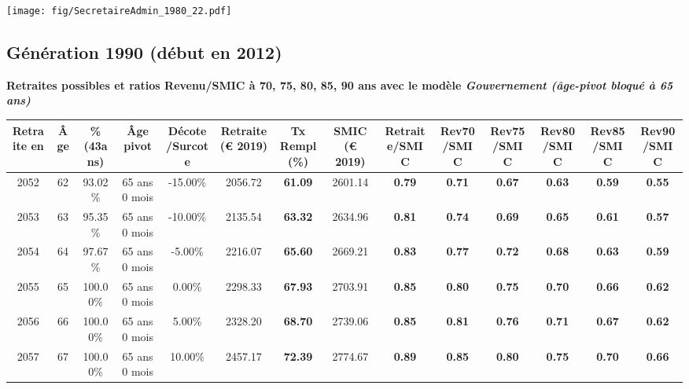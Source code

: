  \vspace{0.1cm} 

 \begin{center}\texttt{[image: fig/SecretaireAdmin\_1980\_22.pdf]}\end{center} \label{fig/SecretaireAdmin_1980_22.pdf} 

\newpage 
 
\subsection{Génération 1990 (début en 2012)} 

{\bf \noindent Retraites possibles et ratios Revenu/SMIC à 70, 75, 80, 85, 90 ans avec le modèle \emph{Gouvernement (âge-pivot bloqué à 65 ans)}}  
 
\begin{adjustbox}{max width=\textwidth} 
\begin{tabular}[htb]{|c|c||c|c|c||c|c||c||c|c|c|c|c|c|} 
\hline 
 Retraite en &  Âge &  \%(43ans) &  Âge pivot &  Décote/Surcote &  Retraite (\euro{} 2019) &  Tx Rempl(\%) &  SMIC (\euro{} 2019) &  Retraite/SMIC &  Rev70/SMIC &  Rev75/SMIC &  Rev80/SMIC &  Rev85/SMIC &  Rev90/SMIC \\ 
\hline \hline 
 2052 &  62 &  93.02\% &  65 ans 0 mois &  -15.00\% &  2056.72 &  {\bf 61.09} &  2601.14 &  {\bf {\color{red} 0.79}} &  {\bf {\color{red} 0.71}} &  {\bf {\color{red} 0.67}} &  {\bf {\color{red} 0.63}} &  {\bf {\color{red} 0.59}} &  {\bf {\color{red} 0.55}} \\ 
\hline 
 2053 &  63 &  95.35\% &  65 ans 0 mois &  -10.00\% &  2135.54 &  {\bf 63.32} &  2634.96 &  {\bf {\color{red} 0.81}} &  {\bf {\color{red} 0.74}} &  {\bf {\color{red} 0.69}} &  {\bf {\color{red} 0.65}} &  {\bf {\color{red} 0.61}} &  {\bf {\color{red} 0.57}} \\ 
\hline 
 2054 &  64 &  97.67\% &  65 ans 0 mois &  -5.00\% &  2216.07 &  {\bf 65.60} &  2669.21 &  {\bf {\color{red} 0.83}} &  {\bf {\color{red} 0.77}} &  {\bf {\color{red} 0.72}} &  {\bf {\color{red} 0.68}} &  {\bf {\color{red} 0.63}} &  {\bf {\color{red} 0.59}} \\ 
\hline 
 2055 &  65 &  100.00\% &  65 ans 0 mois &  0.00\% &  2298.33 &  {\bf 67.93} &  2703.91 &  {\bf {\color{red} 0.85}} &  {\bf {\color{red} 0.80}} &  {\bf {\color{red} 0.75}} &  {\bf {\color{red} 0.70}} &  {\bf {\color{red} 0.66}} &  {\bf {\color{red} 0.62}} \\ 
\hline 
 2056 &  66 &  100.00\% &  65 ans 0 mois &  5.00\% &  2328.20 &  {\bf 68.70} &  2739.06 &  {\bf {\color{red} 0.85}} &  {\bf {\color{red} 0.81}} &  {\bf {\color{red} 0.76}} &  {\bf {\color{red} 0.71}} &  {\bf {\color{red} 0.67}} &  {\bf {\color{red} 0.62}} \\ 
\hline 
 2057 &  67 &  100.00\% &  65 ans 0 mois &  10.00\% &  2457.17 &  {\bf 72.39} &  2774.67 &  {\bf {\color{red} 0.89}} &  {\bf {\color{red} 0.85}} &  {\bf {\color{red} 0.80}} &  {\bf {\color{red} 0.75}} &  {\bf {\color{red} 0.70}} &  {\bf {\color{red} 0.66}} \\ 
\hline 
\hline 
\end{tabular} 
\end{adjustbox} 
 
